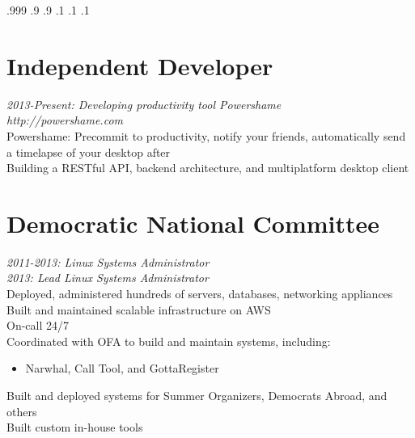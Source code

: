 \documentclass[9pt]{res} %
\begin{document}

\moveleft.999\hoffset{}  
\moveleft.9\hoffset{}
\moveleft.9\hoffset{}
\vspace{-14mm}
\moveright.1\hoffset{}
\moveright.1\hoffset{}
\moveright.1\hoffset{}
\begin{resume}

\section{Independent Developer} 

{\sl 2013-Present: Developing productivity tool Powershame  } \\
{\sl http://powershame.com } \\
{Powershame: Precommit to productivity, notify your friends, automatically send a timelapse of your desktop after}\\
{Building a RESTful API, backend architecture, and multiplatform desktop client} \\
\section{Democratic National Committee} 

{\sl 2011-2013: Linux Systems Administrator} \\
{\sl 2013: Lead Linux Systems Administrator} \\
Deployed, administered hundreds of servers, databases, networking appliances \\
Built and maintained scalable infrastructure on AWS \\
On-call 24/7 \\
Coordinated with OFA to build and maintain systems, including:
\begin{itemize} \item Narwhal, Call Tool, and GottaRegister \end{itemize}
\vspace{-4mm}
Built and deployed systems for Summer Organizers, Democrats Abroad, and others \\
Built custom in-house tools \\



\end{resume}
\end{document}
